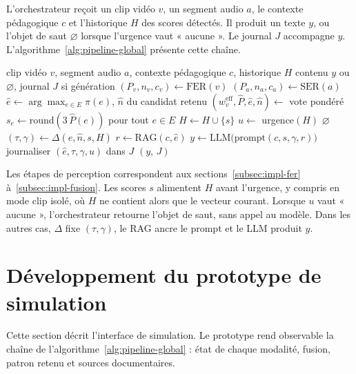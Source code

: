 L'orchestrateur reçoit un clip vidéo $v$, un segment audio $a$, le
contexte pédagogique $c$ et l'historique $H$ des scores détectés.
Il produit un texte $y$, ou l'objet de saut $\varnothing$ lorsque
l'urgence vaut « aucune ». Le journal $J$ accompagne $y$.
L'algorithme~\ref{alg:pipeline-global} présente cette chaîne.

\begin{algorithm}[H]
\caption{Chaîne complète \emolearn{} : perception, décision, génération}
\label{alg:pipeline-global}
\begin{algorithmic}[1]
\Require clip vidéo $v$, segment audio $a$,
contexte pédagogique $c$, historique $H$
\Ensure contenu $y$ ou $\varnothing$, journal $J$ si génération
\State $(P_v, n_v, c_v) \gets \mathrm{FER}(v)$
\State $(P_a, n_a, c_a) \gets \mathrm{SER}(a)$
    \State $\hat{e} \gets \arg\max_{e \in E} \pi(e)$,
          $\hat{n}$ du candidat retenu
\Else
    \State $(w_v^{\mathrm{eff}},\hat{P},\hat{e},\hat{n})
          \gets$ vote pondéré
\EndIf
\State $s_e \gets \mathrm{round}(3\,\hat{P}(e))$ pour tout $e \in E$
\State $H \gets H \cup \{s\}$
\State $u \gets$ urgence$(H)$
    \State \Return $\varnothing$
\EndIf
\State $(\tau,\gamma) \gets \Delta(\hat{e},\hat{n},s,H)$
\State $r \gets \mathrm{RAG}(c,\hat{e})$
\State $y \gets \mathrm{LLM}\bigl(\mathrm{prompt}(c,s,\gamma,r)\bigr)$
\State journaliser $(\hat{e},\tau,\gamma,u)$ dans $J$
\State \Return $(y,\,J)$
\end{algorithmic}
\end{algorithm}

Les étapes de perception correspondent aux
sections~\ref{subsec:impl-fer} à~\ref{subsec:impl-fusion}. Les scores
$s$ alimentent $H$ avant l'urgence, y compris en mode clip isolé, où
$H$ ne contient alors que le vecteur courant. Lorsque $u$ vaut
« aucune », l'orchestrateur retourne l'objet de saut, sans appel au
modèle. Dans les autres cas, $\Delta$ fixe $(\tau,\gamma)$, le RAG
ancre le prompt et le LLM produit $y$.

\section{Développement du prototype de simulation}
\label{sec:impl-prototype}
\label{sec:prototype}

Cette section décrit l'interface de simulation. Le prototype rend
observable la chaîne de l'algorithme~\ref{alg:pipeline-global} : état
de chaque modalité, fusion, patron retenu et sources documentaires.

